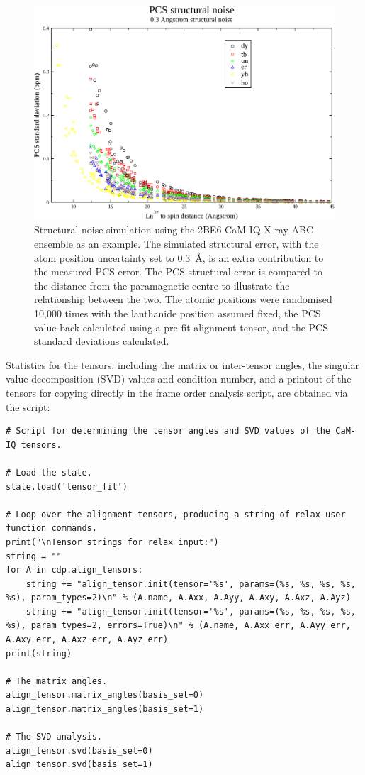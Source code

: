 \begin{figure}
  \centerline{
    \includegraphics[width=\textwidth]{images/cam_iq_abc_whole_structural_noise}
  }
  \caption[Structural noise and the PCS error.]{
    Structural noise simulation using the 2BE6 CaM-IQ X-ray ABC ensemble as an example.
    The simulated structural error, with the atom position uncertainty set to 0.3~\AA, is an extra contribution to the measured PCS error.
    The PCS structural error is compared to the distance from the paramagnetic centre to illustrate the relationship between the two.
    The atomic positions were randomised 10,000 times with the lanthanide position assumed fixed, the PCS value back-calculated using a pre-fit alignment tensor, and the PCS standard deviations calculated.
  }
  \label{fig: CaM-IQ ABC X-ray structural noise}
\end{figure}


Statistics for the tensors, including the matrix or inter-tensor angles, the singular value decomposition (SVD) values and condition number, and a printout of the tensors for copying directly in the frame order analysis script, are obtained via the script:

\begin{lstlisting}
# Script for determining the tensor angles and SVD values of the CaM-IQ tensors.

# Load the state.
state.load('tensor_fit')

# Loop over the alignment tensors, producing a string of relax user function commands.
print("\nTensor strings for relax input:")
string = ""
for A in cdp.align_tensors:
    string += "align_tensor.init(tensor='%s', params=(%s, %s, %s, %s, %s), param_types=2)\n" % (A.name, A.Axx, A.Ayy, A.Axy, A.Axz, A.Ayz)
    string += "align_tensor.init(tensor='%s', params=(%s, %s, %s, %s, %s), param_types=2, errors=True)\n" % (A.name, A.Axx_err, A.Ayy_err, A.Axy_err, A.Axz_err, A.Ayz_err)
print(string)

# The matrix angles.
align_tensor.matrix_angles(basis_set=0)
align_tensor.matrix_angles(basis_set=1)

# The SVD analysis.
align_tensor.svd(basis_set=0)
align_tensor.svd(basis_set=1)
\end{lstlisting}


